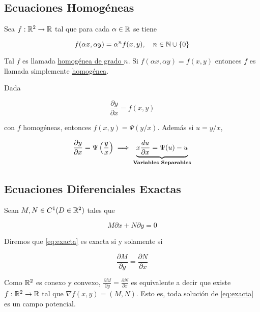 \subsection*{Ecuaciones Homogéneas}

\begin{defn}
    Sea $f: \mathbb{R}^2 \rightarrow \mathbb{R}$ tal que para cada $\alpha \in \mathbb{R}$ se tiene

    \[
        f(\alpha x, \alpha y) = \alpha^n f(x, y), \quad n \in \mathbb{N} \cup \{0\}
    \]

    Tal $f$ es llamada \ul{homogénea de grado $n$}. Si $f(\alpha x, \alpha y) = f(x, y)$ entonces $f$ es llamada simplemente \ul{homogénea}.
\end{defn}

\begin{pro}
    Dada

    \[
        \frac{\partial y}{\partial x} = f(x,y)
    \]

    con $f$ homogéneas, entonces $f(x, y) = \Psi (y/x) $. Además si $u = y/x$,

    \[
        \frac{\partial y}{\partial x} = \Psi \left( \frac{y}{x} \right) \implies \LaTeXunderbrace{x\frac{du}{\partial x} = \Psi(u) - u}_{\text{\textbf{Variables Separables}}}
    \]
\end{pro}

\subsection*{Ecuaciones Diferenciales Exactas}

\begin{defn}
    Sean $M, N \in C^1(D \in \mathbb{R}^2)$ tales que

    \begin{equation}\label{eq:exacta}
        M \partial x + N \partial y = 0
    \end{equation}

    Diremos que \ref{eq:exacta} es exacta si y solamente si

    \[
        \displaystyle\frac{\partial M}{\partial y} = \frac{\partial N}{\partial x}
    \]
\end{defn}

\begin{teo}
    Como $\mathbb{R}^2$ es conexo y convexo, $\frac{\partial M}{\partial y} = \frac{\partial N}{\partial x}$ es equivalente a decir que existe $f: \mathbb{R}^2 \rightarrow \mathbb{R}$ tal que $\nabla f(x,y) = (M, N)$. Esto es, toda solución de \ref{eq:exacta} es un campo potencial.
\end{teo}